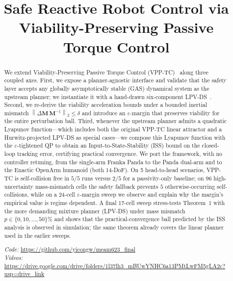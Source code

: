 \documentclass[10pt,conference]{IEEEtran}
\title{Safe Reactive Robot Control via\\ Viability-Preserving
Passive Torque Control}
\author{\IEEEauthorblockN{Yicong Wang}
\IEEEauthorblockA{
University of Pennsylvania\\
\texttt{yicongw@seas.upenn.edu}}}
\newcommand{\bM}{\bm{M}}
\newcommand{\norm}[1]{\left\lVert #1 \right\rVert}
\theoremstyle{remark}
\theoremstyle{plain}
\begin{document}
\maketitle

\begin{abstract}
We extend Viability-Preserving Passive Torque Control
(VPP-TC)~\cite{zhang2025vpptc} along three coupled axes.
First, we expose a planner-agnostic interface and validate that
the safety layer accepts any globally asymptotically stable (GAS)
dynamical system as the upstream planner; we instantiate it with a
hand-drawn six-component LPV-DS~\cite{figueroa2018lpvds}.
Second, we re-derive the viability acceleration bounds under a
bounded inertial mismatch
$\norm{\Delta\bM\,\bM^{-1}}_2 \le \delta$ and introduce an
$\varepsilon$-margin that preserves viability for the entire
perturbation ball.
Third, whenever the upstream planner admits a quadratic Lyapunov
function---which includes both the original VPP-TC linear
attractor and a Hurwitz-projected LPV-DS as special cases---we
compose this Lyapunov function with the $\varepsilon$-tightened
QP to obtain an Input-to-State-Stability (ISS) bound on the
closed-loop tracking error, certifying practical convergence.
We port the framework, with no controller retuning, from the
single-arm Franka Panda to the Panda dual-arm and to the
Enactic OpenArm humanoid (both 14-DoF).
On 5 head-to-head scenarios, VPP-TC is self-collision free in
$5/5$ runs versus $2/5$ for a passivity-only baseline; on 96
high-uncertainty mass-mismatch cells the safety fallback prevents
$5$ otherwise-occurring self-collisions, while on a 24-cell
$\varepsilon$-margin sweep we observe and explain why the
margin's empirical value is regime dependent.
A final 17-cell sweep stress-tests Theorem~1 with the more
demanding mixture planner (LPV-DS) under mass mismatch
$p\in\{0,10,\dots,50\}\%$ and shows that the
practical-convergence ball predicted by the ISS analysis is
observed in simulation; the same theorem already covers the
linear planner used in the earlier sweeps.

{\sloppy\noindent\textit{Code:} \url{https://github.com/yicongw/meam623_final}\\
\textit{Videos:} \url{https://drive.google.com/drive/folders/1l37lh3_mBUwYNHC6a13PMtLwFM5gLA2c?usp=drive_link}\par}
\end{abstract}


\end{document}
